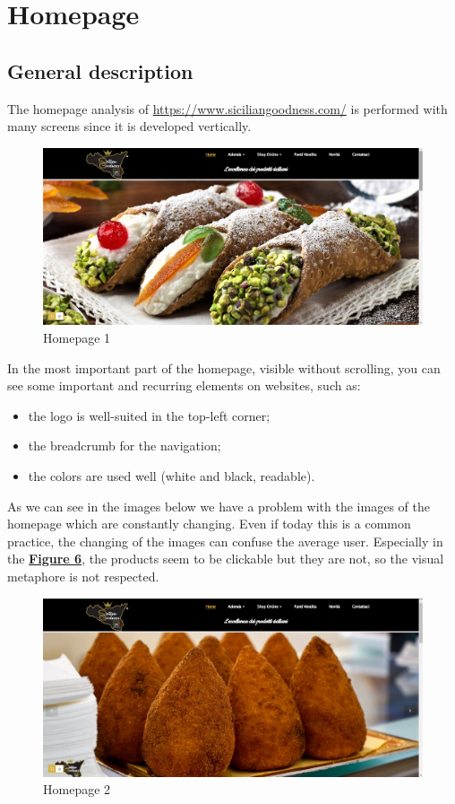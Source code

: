 \section{Homepage}

\subsection{General description}
The homepage analysis of \url{https://www.siciliangoodness.com/} is performed with many screens since it is developed vertically.

	\begin{figure}[H]
	\centering\includegraphics[width=12cm]{Img/hom1.png}
	\caption{Homepage 1}
	\end{figure}

In the most important part of the homepage, visible without scrolling, you can see some important and recurring elements on websites, such as:

\begin{itemize}
	\item the logo is well-suited in the top-left corner;
	\item the breadcrumb for the navigation;
	\item the colors are used well (white and black, readable).
\end{itemize}

As we can see in the images below we have a problem with the images of the homepage which are constantly changing. 
Even if today this is a common practice, the changing of the images can confuse the average user.
Especially in the \textbf{\hyperlink{hom5}{Figure 6}}, the products seem to be clickable but they are not, so the visual metaphore is not respected. \newline

\begin{figure}[H]
	\centering\includegraphics[width=12cm]{Img/hom2.png}
	\caption{Homepage 2}
\end{figure}

